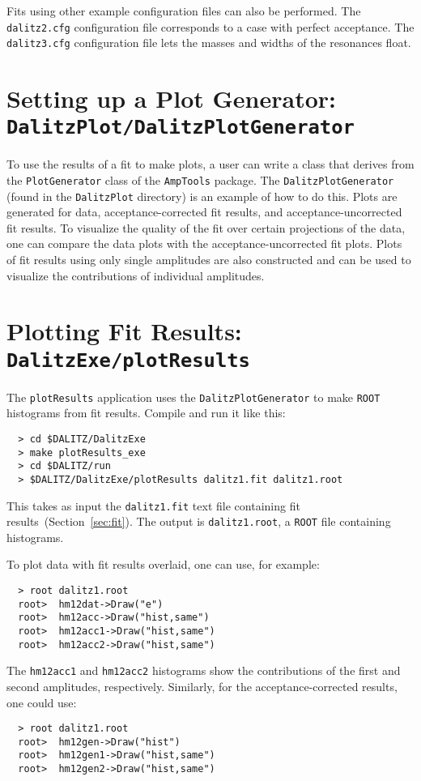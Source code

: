 \documentclass[11pt]{article}
\begin{document}
Fits using other example configuration files can also be performed.  The {\tt dalitz2.cfg} configuration file corresponds to a case with perfect acceptance.  The {\tt dalitz3.cfg} configuration file lets the masses and widths of the resonances float.

\section{Setting up a Plot Generator: \\
{\tt DalitzPlot/DalitzPlotGenerator}}
\label{sec:dpg}

To use the results of a fit to make plots, a user can write a class that derives from the {\tt PlotGenerator} class of the {\tt AmpTools} package.  The {\tt DalitzPlotGenerator} (found in the {\tt DalitzPlot} directory) is an example of how to do this.  Plots are generated for data, acceptance-corrected fit results, and acceptance-uncorrected fit results.  To visualize the quality of the fit over certain projections of the data, one can compare the data plots with the acceptance-uncorrected fit plots.  Plots of fit results using only single amplitudes are also constructed and can be used to visualize the contributions of individual amplitudes.


\section{Plotting Fit Results: \\
{\tt DalitzExe/plotResults}}

The {\tt plotResults} application uses the {\tt DalitzPlotGenerator} to make {\tt ROOT} histograms from fit results.  Compile and run it like this:
\begin{verbatim}
  > cd $DALITZ/DalitzExe
  > make plotResults_exe
  > cd $DALITZ/run
  > $DALITZ/DalitzExe/plotResults dalitz1.fit dalitz1.root
\end{verbatim}
This takes as input the {\tt dalitz1.fit} text file containing fit results~(Section~\ref{sec:fit}).  The output is {\tt dalitz1.root}, a {\tt ROOT} file containing histograms.

To plot data with fit results overlaid, one can use, for example:
\begin{verbatim}
  > root dalitz1.root
  root>  hm12dat->Draw("e")
  root>  hm12acc->Draw("hist,same")
  root>  hm12acc1->Draw("hist,same")
  root>  hm12acc2->Draw("hist,same")
\end{verbatim}
The {\tt hm12acc1} and {\tt hm12acc2} histograms show the contributions of the first and second amplitudes, respectively.  Similarly, for the acceptance-corrected results, one could use:
\begin{verbatim}
  > root dalitz1.root
  root>  hm12gen->Draw("hist")
  root>  hm12gen1->Draw("hist,same")
  root>  hm12gen2->Draw("hist,same")
\end{verbatim}
\end{document}
